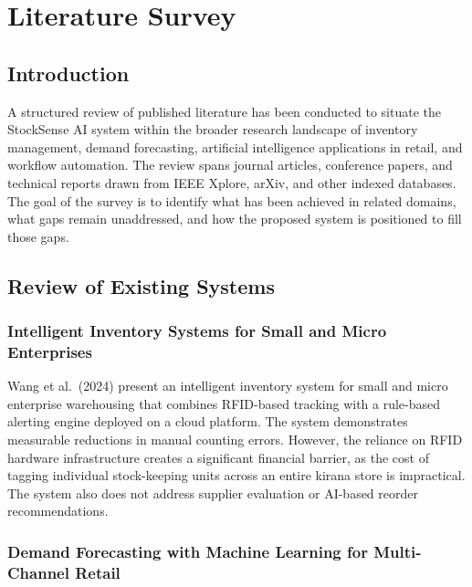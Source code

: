 \chapter{Literature Survey}
\label{ch:lit}

\section{Introduction}

A structured review of published literature has been conducted to situate the StockSense AI
system within the broader research landscape of inventory management, demand forecasting,
artificial intelligence applications in retail, and workflow automation. The review spans
journal articles, conference papers, and technical reports drawn from IEEE Xplore, arXiv, and
other indexed databases. The goal of the survey is to identify what has been achieved in related
domains, what gaps remain unaddressed, and how the proposed system is positioned to fill those
gaps.

\section{Review of Existing Systems}

\subsection{Intelligent Inventory Systems for Small and Micro Enterprises}

Wang et al.\ (2024) \cite{wang2024} present an intelligent inventory system for small and micro
enterprise warehousing that combines RFID-based tracking with a rule-based alerting engine
deployed on a cloud platform. The system demonstrates measurable reductions in manual counting
errors. However, the reliance on RFID hardware infrastructure creates a significant financial
barrier, as the cost of tagging individual stock-keeping units across an entire kirana store is
impractical. The system also does not address supplier evaluation or AI-based reorder
recommendations.

\subsection{Demand Forecasting with Machine Learning for Multi-Channel Retail}

